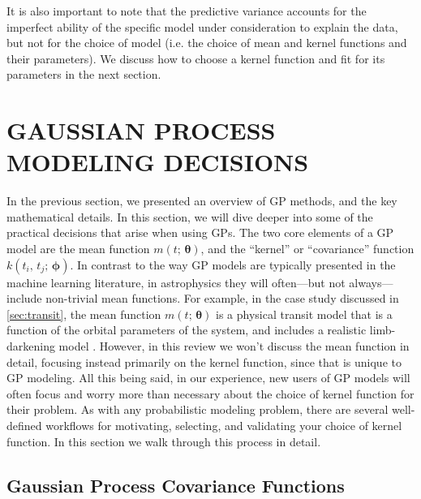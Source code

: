 \documentclass[letterpaper]{ar-1col}
\newcommand{\hyperparams}{\ensuremath{\boldsymbol{\phi}}}
\newcommand{\meanparams}{\ensuremath{\boldsymbol{\theta}}}
\begin{document}
It is also important to note that the predictive variance accounts for the imperfect ability of the specific model under consideration to explain the data, but not for the choice of model (i.e. the choice of mean and kernel functions and their parameters). We discuss how to choose a kernel function and fit for its parameters in the next section.

\section{GAUSSIAN PROCESS MODELING DECISIONS}
\label{sec:choices}

In the previous section, we presented an overview of GP methods, and the key mathematical details. In this section, we will dive deeper into some of the practical decisions that arise when using GPs.
The two core elements of a GP model are the mean function $m(t;\,\meanparams)$, and the ``kernel'' or ``covariance'' function $k(t_i,\,t_j;\,\hyperparams)$. In contrast to the way GP models are typically presented in the machine learning literature, in astrophysics they will often---but not always---include non-trivial mean functions.
For example, in the case study discussed in \autoref{sec:transit}, the mean function $m(t;\,\meanparams)$ is a physical transit model that is a function of the orbital parameters of the system, and includes a realistic limb-darkening model \citep{2002ApJ...580L.171M}.
However, in this review we won't discuss the mean function in detail, focusing instead primarily on the kernel function, since that is unique to GP modeling.
All this being said, in our experience, new users of GP models will often focus and worry more than necessary about the choice of kernel function for their problem.
As with any probabilistic modeling problem, there are several well-defined workflows for motivating, selecting, and validating your choice of kernel function.
In this section we walk through this process in detail.

\subsection{Gaussian Process Covariance Functions}
\label{sec:kernels}
\end{document}
